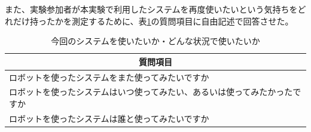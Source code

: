 \documentclass[11pt, a4paper]{jreport} %
\begin{document}

また、実験参加者が本実験で利用したシステムを再度使いたいという気持ちをどれだけ持ったかを測定するために、表\ref{tab:intention}の質問項目に自由記述で回答させた。
\begin{table}[H]
\caption{今回のシステムを使いたいか・どんな状況で使いたいか}
\centering
\label{tab:intention}
\begin{tabular}{@{}l@{}}
\toprule
\multicolumn{1}{c}{質問項目}              \\ \midrule
ロボットを使ったシステムをまた使ってみたいですか\\
ロボットを使ったシステムはいつ使ってみたい、あるいは使ってみたかったですか\\
ロボットを使ったシステムは誰と使ってみたいですか \\ \bottomrule
\end{tabular}
\end{table}
\end{document}
